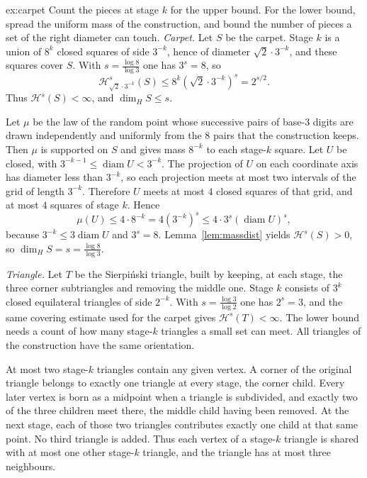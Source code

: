 \begin{solution}{ex:carpet}
\idea Count the pieces at stage $k$ for the upper bound. For the lower bound, spread the uniform mass of the construction, and bound the
number of pieces a set of the right diameter can touch.
\writeup \emph{Carpet.} Let $S$ be the carpet. Stage $k$ is a union of $8^k$ closed squares of side $3^{-k}$, hence of diameter
$\sqrt 2\cdot 3^{-k}$, and these squares cover $S$. With $s=\frac{\log 8}{\log 3}$ one has $3^s=8$, so
\[\mathcal H^s_{\sqrt 2\cdot 3^{-k}}(S)\le 8^k(\sqrt 2\cdot 3^{-k})^s=2^{s/2}.\]
Thus $\mathcal H^s(S)<\infty$, and $\dim_H S\le s$.

Let $\mu$ be the law of the random point whose successive pairs of base-$3$ digits are drawn independently and uniformly from the $8$ pairs
that the construction keeps. Then $\mu$ is supported on $S$ and gives mass $8^{-k}$ to each stage-$k$ square. Let $U$ be closed, with
$3^{-k-1}\le\operatorname{diam}U<3^{-k}$. The projection of $U$ on each coordinate axis has diameter less than $3^{-k}$, so each projection meets at most
two intervals of the grid of length $3^{-k}$. Therefore $U$ meets at most $4$ closed squares of that grid, and at most $4$ squares of stage
$k$. Hence
\[\mu(U)\le 4\cdot 8^{-k}=4(3^{-k})^s\le 4\cdot 3^s(\operatorname{diam}U)^s,\]
because $3^{-k}\le 3\operatorname{diam}U$ and $3^s=8$. Lemma~\ref{lem:massdist} yields $\mathcal H^s(S)>0$, so $\dim_H S=s=\frac{\log 8}{\log 3}$.

\emph{Triangle.} Let $T$ be the Sierpi\'nski triangle, built by keeping, at each stage, the three corner subtriangles and removing the middle
one. Stage $k$ consists of $3^k$ closed equilateral triangles of side $2^{-k}$. With $s=\frac{\log 3}{\log 2}$ one has $2^s=3$, and the same
covering estimate used for the carpet gives $\mathcal H^s(T)<\infty$. The lower bound needs a count of how many stage-$k$ triangles a small
set can meet. All triangles of the construction have the same orientation.

At most two stage-$k$ triangles contain any given vertex. A corner of the original triangle belongs to exactly one triangle at every stage,
the corner child. Every later vertex is born as a midpoint when a triangle is subdivided, and exactly two of the three children meet there,
the middle child having been removed. At the next stage, each of those two triangles contributes exactly one child at that same point. No
third triangle is added. Thus each vertex of a stage-$k$ triangle is shared with at most one other stage-$k$ triangle, and the triangle has
at most three neighbours.


\end{solution}
